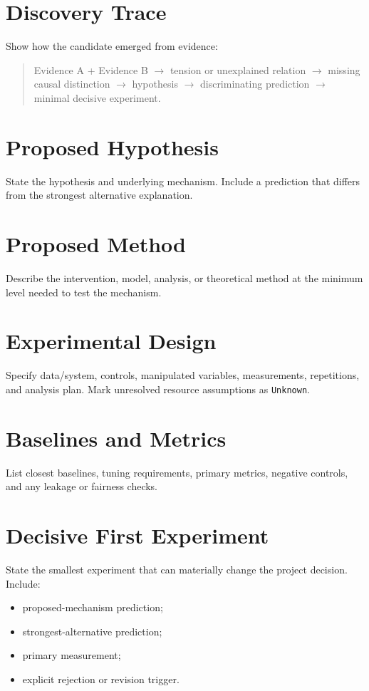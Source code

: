 \documentclass[11pt]{article}
\begin{document}
\section{Discovery Trace}
Show how the candidate emerged from evidence:
\begin{quote}
Evidence A + Evidence B $\rightarrow$ tension or unexplained relation $\rightarrow$ missing causal distinction $\rightarrow$ hypothesis $\rightarrow$ discriminating prediction $\rightarrow$ minimal decisive experiment.
\end{quote}

\section{Proposed Hypothesis}
State the hypothesis and underlying mechanism. Include a prediction that differs from the strongest alternative explanation.

\section{Proposed Method}
Describe the intervention, model, analysis, or theoretical method at the minimum level needed to test the mechanism.

\section{Experimental Design}
Specify data/system, controls, manipulated variables, measurements, repetitions, and analysis plan. Mark unresolved resource assumptions as \texttt{Unknown}.

\section{Baselines and Metrics}
List closest baselines, tuning requirements, primary metrics, negative controls, and any leakage or fairness checks.

\section{Decisive First Experiment}
State the smallest experiment that can materially change the project decision. Include:
\begin{itemize}
  \item proposed-mechanism prediction;
  \item strongest-alternative prediction;
  \item primary measurement;
  \item explicit rejection or revision trigger.
\end{itemize}
\end{document}
